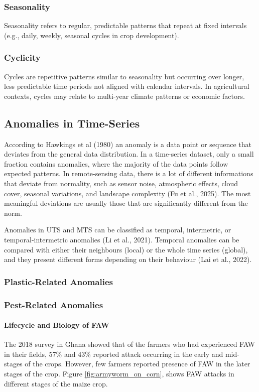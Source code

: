 \documentclass{article} %
\begin{document}
        \subsubsection{Seasonality}
            Seasonality refers to regular, predictable patterns that repeat at fixed intervals (e.g., daily, weekly, seasonal cycles in crop development).

        \subsubsection{Cyclicity}
            Cycles are repetitive patterns similar to seasonality but occurring over longer, less predictable time periods not aligned with calendar intervals. In agricultural contexts, cycles may relate to multi-year climate patterns or economic factors.

    \subsection{Anomalies in Time-Series}
        According to Hawkings et al (1980) an anomaly is a data point or sequence that deviates from the general data distribution. In a time-series dataset, only a small fraction contains anomalies, where the majority of the data points follow expected patterns. In remote-sensing data, there is a lot of different informations that deviate from normality, such as sensor noise, atmospheric effects, cloud cover, seasonal variations, and landscape complexity (Fu et al., 2025). The most meaningful deviations are usually those that are significantly different from the norm.

        Anomalies in UTS and MTS can be classified as temporal, intermetric, or temporal-intermetric anomalies (Li et al., 2021).  Temporal anomalies can be compared with either their neighbours (local) or the whole time series (global), and they present different forms depending on their behaviour (Lai et al., 2022).

        \subsubsection{Plastic-Related Anomalies}

        \subsubsection{Pest-Related Anomalies}

            \paragraph{Lifecycle and Biology of FAW }
                The 2018 survey in Ghana showed that of the farmers who had experienced FAW in
                their fields, 57\% and 43\% reported attack occurring in the early and mid-stages of the crops. However,
                few farmers reported presence of FAW in the later stages of the crop. Figure \ref{fig:armyworm_on_corn},
                shows FAW attacks in different stages of the maize crop.
\end{document}
